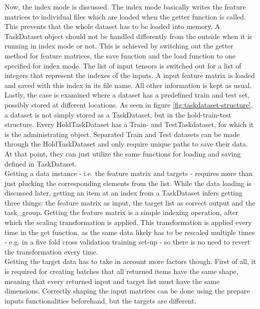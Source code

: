Now, the index mode is discussed. The index mode basically writes the feature matrices to individual files which are loaded when the getter function is called. This prevents that the whole dataset has to be loaded into memory. A TaskDataset object should not be handled differently from the outside when it is running in index mode or not. This is achieved by switching out the getter method for feature matrices, the save function and the load function to one specified for index mode. The list of input tensors is switched out for a list of integers that represent the indexes of the inputs. A input feature matrix is loaded and saved with this index in its file name. All other information is kept as usual. \\

Lastly, the case is examined where a dataset has a predefined train and test set, possibly stored at different locations. As seen in figure \ref{fig:taskdataset-structure}, a dataset is not simply stored as a TaskDataset, but in the hold-train-test structure. Every HoldTaskDataset has a Train- and TestTaskdataset, for which it is the administrating object. Separated Train and Test datasets can be made through the HoldTaskDataset and only require unique paths to save their data. At that point, they can just utilize the same functions for loading and saving defined in TaskDataset. \\

Getting a data instance - i.e. the feature matrix and targets - requires more than just plucking the corresponding elements from the list. While the data loading is discussed later, getting an item at an index from a TaskDataset infers getting three things: the feature matrix as input, the target list as correct output and the task\_group. Getting the feature matrix is a simple indexing operation, after which the scaling transformation is applied. This transformation is applied every time in the get function, as the same data likely has to be rescaled multiple times - e.g. in a five fold cross validation training set-up - so there is no need to revert the transformation every time. \\


Getting the target data has to take in account more factors though. First of all, it is required for creating batches that all returned items have the same shape, meaning that every returned input and target list must have the same dimensions. Correctly shaping the input matrices can be done using the prepare inputs functionalities beforehand, but the targets are different. \\


